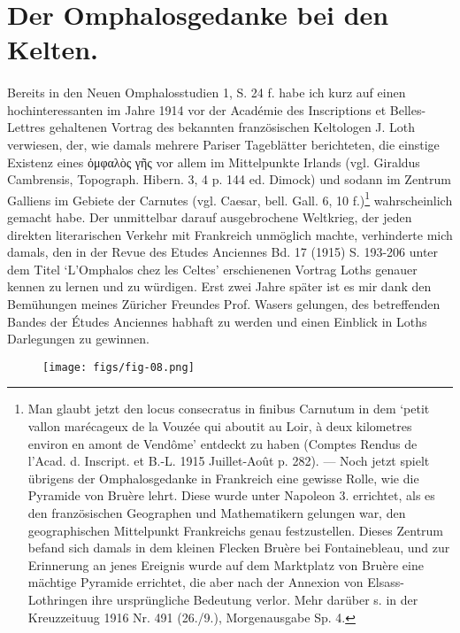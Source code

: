 \documentclass[a4paper, 11pt, oneside]{article}
\begin{document}
\section{Der Omphalosgedanke bei den Kelten.}
\paragraph{}
Bereits in den Neuen Omphalosstudien 1, S. 24 f. habe ich kurz auf einen hochinteressanten im Jahre 1914 vor der Académie des Inscriptions et Belles-Lettres gehaltenen Vortrag des bekannten französischen Keltologen J. Loth verwiesen, der, wie damals mehrere Pariser Tageblätter berichteten, die einstige Existenz eines ὀμφαλὸς γῆς vor allem im Mittelpunkte Irlands (vgl. Giraldus Cambrensis, Topograph. Hibern. 3, 4 p. 144 ed. Dimock) und sodann im Zentrum Galliens im Gebiete der Carnutes (vgl. Caesar, bell. Gall. 6, 10 f.)\footnote{Man glaubt jetzt den locus consecratus in finibus Carnutum in dem `petit vallon marécageux de la Vouzée qui aboutit au Loir, à deux kilometres environ en amont de Vendôme' entdeckt zu haben (Comptes Rendus de l'Acad. d. Inscript. et B.-L. 1915 Juillet-Août p. 282). --- Noch jetzt spielt übrigens der Omphalosgedanke in Frankreich eine gewisse Rolle, wie die Pyramide von Bruère lehrt. Diese wurde unter Napoleon 3. errichtet, als es den französischen Geographen und Mathematikern gelungen war, den geographischen Mittelpunkt Frankreichs genau festzustellen. Dieses Zentrum befand sich damals in dem kleinen Flecken Bruère bei Fontainebleau, und zur Erinnerung an jenes Ereignis wurde auf dem Marktplatz von Bruère eine mächtige Pyramide errichtet, die aber nach der Annexion von Elsass-Lothringen ihre ursprüngliche Bedeutung verlor. Mehr darüber s. in der Kreuzzeituug 1916 Nr. 491 (26./9.), Morgenausgabe Sp. 4.} wahrscheinlich gemacht habe. Der unmittelbar darauf ausgebrochene Weltkrieg, der jeden direkten literarischen Verkehr mit Frankreich unmöglich machte, verhinderte mich damals, den in der Revue des Etudes Anciennes Bd. 17 (1915) S. 193-206 unter dem Titel `L'Omphalos chez les Celtes' erschienenen Vortrag Loths genauer kennen zu lernen und zu würdigen. Erst zwei Jahre später ist es mir dank den Bemühungen meines Züricher Freundes Prof. Wasers gelungen, des betreffenden Bandes der Études Anciennes habhaft zu werden und einen Einblick in Loths Darlegungen zu gewinnen.

\begin{figure}[H]
\centering
\texttt{[image: figs/fig-08.png]}
\caption{}
\end{figure}
\end{document}
